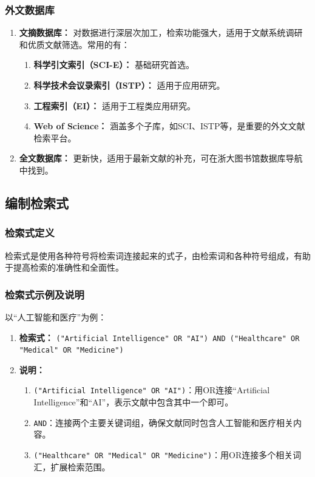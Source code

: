 \documentclass{amznotes}
\begin{document}
\subsubsection{外文数据库}

\begin{enumerate}
  \item \textbf{文摘数据库：} 对数据进行深层次加工，检索功能强大，适用于文献系统调研和优质文献筛选。常用的有：
  \begin{enumerate}
    \item \textbf{科学引文索引（SCI-E）：} 基础研究首选。
    \item \textbf{科学技术会议录索引（ISTP）：} 适用于应用研究。
    \item \textbf{工程索引（EI）：} 适用于工程类应用研究。
    \item \textbf{Web of Science：} 涵盖多个子库，如SCI、ISTP等，是重要的外文文献检索平台。
  \end{enumerate}
  \item \textbf{全文数据库：} 更新快，适用于最新文献的补充，可在浙大图书馆数据库导航中找到。
\end{enumerate}

\subsection{编制检索式}

\subsubsection{检索式定义}

检索式是使用各种符号将检索词连接起来的式子，由检索词和各种符号组成，有助于提高检索的准确性和全面性。

\subsubsection{检索式示例及说明}

以“人工智能和医疗”为例：

\begin{enumerate}
  \item \textbf{检索式：} \texttt{("Artificial Intelligence" OR "AI") AND ("Healthcare" OR "Medical" OR "Medicine")}
  \item \textbf{说明：}
  \begin{enumerate}
    \item \texttt{("Artificial Intelligence" OR "AI")}：用OR连接“Artificial Intelligence”和“AI”，表示文献中包含其中一个即可。
    \item \texttt{AND}：连接两个主要关键词组，确保文献同时包含人工智能和医疗相关内容。
    \item \texttt{("Healthcare" OR "Medical" OR "Medicine")}：用OR连接多个相关词汇，扩展检索范围。
  \end{enumerate}
\end{enumerate}
\end{document}
